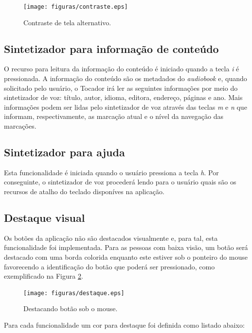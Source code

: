  \begin{figure}[ht]
	\centering
		\texttt{[image: figuras/contraste.eps]}
	\caption{Contraste de tela alternativo.}
	\label{contraste}
\end{figure}

\subsection{Sintetizador para informação de conteúdo}\label{ttscontent}

O recurso para leitura da informação do conteúdo é iniciado quando a tecla \textit{i} é pressionada. A informação do conteúdo são os metadados do \textit{audiobook} e, quando solicitado pelo usuário, o Tocador irá ler as seguintes informações por meio do sintetizador de voz: título, autor, idioma, editora, endereço, páginas e ano. Mais informações podem ser lidas pelo sintetizador de voz através das teclas \textit{m} e \textit{n} que informam, respectivamente, as marcação atual e o nível da navegação das marcações.

\subsection{Sintetizador para ajuda}\label{ttshelp}

Esta funcionalidade é iniciada quando o usuário pressiona a tecla \textit{h}. Por conseguinte, o sintetizador de voz procederá lendo para o usuário quais são os recursos de atalho do teclado disponíves na aplicação.

\subsection{Destaque visual}

Os botões da aplicação não são destacados visualmente e, para tal, esta funcionalidade foi implementada. Para as pessoas com baixa visão, um botão será destacado com uma borda colorida enquanto este estiver sob o ponteiro do mouse favorecendo a identificação do botão que poderá ser pressionado, como exemplificado na Figura \ref{destaque}.

 \begin{figure}[ht]
	\centering
		\texttt{[image: figuras/destaque.eps]}
	\caption{Destacando botão sob o mouse.}
	\label{destaque}
\end{figure}

Para cada funcionalidade um cor para destaque foi definida como listado abaixo:

